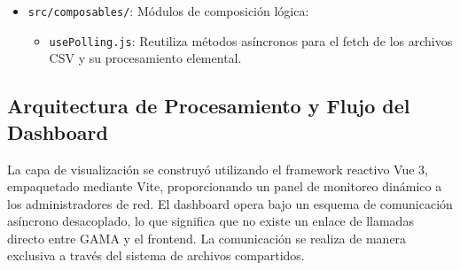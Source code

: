 \begin{itemize}
\begin{itemize}
        \begin{itemize}
            \item \texttt{CytoscapeMap.vue}: Encapsula Cytoscape.js para instanciar el mapa de red lógico-espacial georreferenciado.
            \item \texttt{ChartsGrid.vue}: Inicializa y gestiona las tres referencias del DOM para las gráficas de Apache ECharts.
        \end{itemize}
        \item \texttt{src/composables/}: Módulos de composición lógica:
        \begin{itemize}
            \item \texttt{usePolling.js}: Reutiliza métodos asíncronos para el fetch de los archivos CSV y su procesamiento elemental.
        \end{itemize}
    \end{itemize}
\end{itemize}

\subsection{Arquitectura de Procesamiento y Flujo del Dashboard}
La capa de visualización se construyó utilizando el framework reactivo Vue 3, empaquetado mediante Vite, proporcionando un panel de monitoreo dinámico a los administradores de red. El dashboard opera bajo un esquema de comunicación asíncrono desacoplado, lo que significa que no existe un enlace de llamadas directo entre GAMA y el frontend. La comunicación se realiza de manera exclusiva a través del sistema de archivos compartidos.

